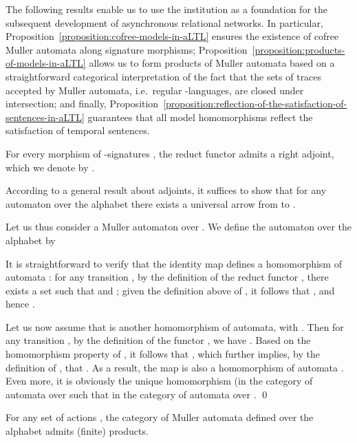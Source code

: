 \documentclass{LMCS}
\begin{document}
The following results enable us to use the institution  as a foundation for the subsequent development of asynchronous relational networks.
In particular, Proposition~\ref{proposition:cofree-models-in-aLTL} ensures the existence of cofree Muller automata along signature morphisms; Proposition~\ref{proposition:products-of-models-in-aLTL} allows us to form products of Muller automata based on a straightforward categorical interpretation of the fact that the sets of traces accepted by Muller automata, i.e.\ regular \nb-languages, are closed under intersection; and finally, Proposition~\ref{proposition:reflection-of-the-satisfaction-of-sentences-in-aLTL} guarantees that all model homomorphisms reflect the satisfaction of temporal sentences.

\begin{prop}
  \label{proposition:cofree-models-in-aLTL}
  For every morphism of \nb-signatures , the reduct functor  admits a right adjoint, which we denote by .
\end{prop}

\proof
According to a general result about adjoints, it suffices to show that for any automaton  over the alphabet  there exists a universal arrow from  to .

Let us thus consider a Muller automaton  over .
We define the automaton  over the alphabet  by

It is straightforward to verify that the identity map  defines a homomorphism of automata : for any transition , by the definition of the reduct functor , there exists a set  such that  and ; given the definition above of , it follows that , and hence .


Let us now assume that  is another homomorphism of automata, with .
Then for any transition , by the definition of the functor , we have .
Based on the homomorphism property of , it follows that , which further implies, by the definition of , that .
As a result, the map  is also a homomorphism of automata .
Even more, it is obviously the unique homomorphism  (in the category of automata over  such that  in the category of automata over .
\qed

\begin{prop}
  \label{proposition:products-of-models-in-aLTL}
  For any set of actions , the category  of Muller automata defined over the alphabet  admits (finite) products.
\end{prop}
\end{document}
